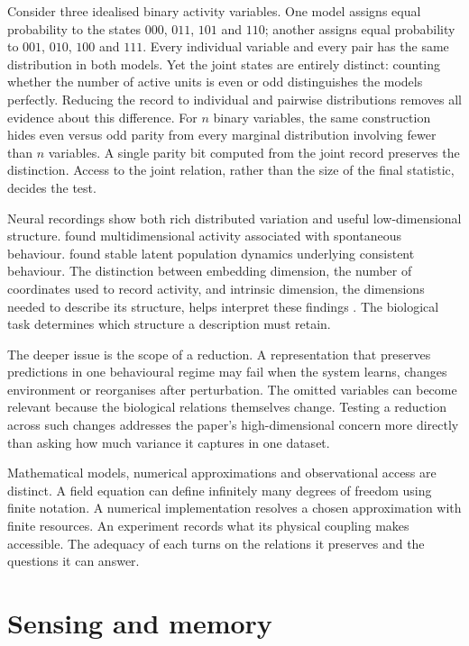 \documentclass[10pt,twocolumn]{article}
\begin{document}
Consider three idealised binary activity variables. One model assigns equal probability to the states \(000\), \(011\), \(101\) and \(110\); another assigns equal probability to \(001\), \(010\), \(100\) and \(111\). Every individual variable and every pair has the same distribution in both models. Yet the joint states are entirely distinct: counting whether the number of active units is even or odd distinguishes the models perfectly. Reducing the record to individual and pairwise distributions removes all evidence about this difference. For \(n\) binary variables, the same construction hides even versus odd parity from every marginal distribution involving fewer than \(n\) variables. A single parity bit computed from the joint record preserves the distinction. Access to the joint relation, rather than the size of the final statistic, decides the test.

Neural recordings show both rich distributed variation and useful low-dimensional structure. \citet{stringer2019} found multidimensional activity associated with spontaneous behaviour. \citet{gallego2020} found stable latent population dynamics underlying consistent behaviour. The distinction between embedding dimension, the number of coordinates used to record activity, and intrinsic dimension, the dimensions needed to describe its structure, helps interpret these findings \citep{jazayeri2021}. The biological task determines which structure a description must retain.

The deeper issue is the scope of a reduction. A representation that preserves predictions in one behavioural regime may fail when the system learns, changes environment or reorganises after perturbation. The omitted variables can become relevant because the biological relations themselves change. Testing a reduction across such changes addresses the paper's high-dimensional concern more directly than asking how much variance it captures in one dataset.

Mathematical models, numerical approximations and observational access are distinct. A field equation can define infinitely many degrees of freedom using finite notation. A numerical implementation resolves a chosen approximation with finite resources. An experiment records what its physical coupling makes accessible. The adequacy of each turns on the relations it preserves and the questions it can answer.

\section{Sensing and memory}
\label{sec:physical}
\end{document}
